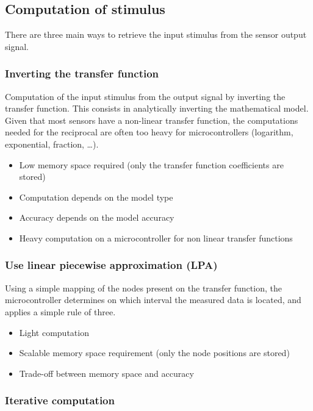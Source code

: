 \subsection{Computation of stimulus}

There are three main ways to retrieve the input stimulus from the sensor output signal. 

\subsubsection{Inverting the transfer function}

Computation of the input stimulus from the output signal by inverting the transfer function.
This consists in analytically inverting the mathematical model. Given that most sensors have 
a non-linear transfer function, the computations needed for the reciprocal are often too heavy 
for microcontrollers (logarithm, exponential, fraction, \dots).

\begin{itemize}
    \item Low memory space required (only the transfer function coefficients are stored)
    \item Computation depends on the model type
    \item Accuracy depends on the model accuracy
    \item Heavy computation
on a microcontroller
for non linear transfer functions
\end{itemize}

\subsubsection{Use linear piecewise approximation (LPA)}

Using a simple mapping of the nodes present on the transfer function, the microcontroller determines 
on which interval the measured data is located, and applies a simple rule of three.

\begin{itemize}
    \item Light computation
    \item Scalable memory space requirement (only the node positions are stored)
    \item Trade-off between memory space and accuracy
\end{itemize}

\subsubsection{Iterative computation}

